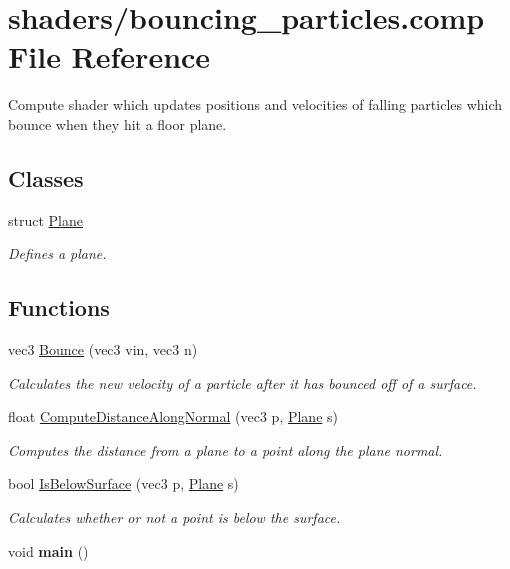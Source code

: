\hypertarget{bouncing__particles_8comp}{}\section{shaders/bouncing\+\_\+particles.comp File Reference}
\label{bouncing__particles_8comp}


Compute shader which updates positions and velocities of falling particles which bounce when they hit a floor plane.  


\subsection*{Classes}
\begin{DoxyCompactItemize}
\item 
struct \hyperlink{struct_plane}{Plane}
\begin{DoxyCompactList}\small\item\em Defines a plane. \end{DoxyCompactList}\end{DoxyCompactItemize}
\subsection*{Functions}
\begin{DoxyCompactItemize}
\item 
vec3 \hyperlink{bouncing__particles_8comp_a11c062c4611d15da5fb25a630e7298b9}{Bounce} (vec3 vin, vec3 n)
\begin{DoxyCompactList}\small\item\em Calculates the new velocity of a particle after it has bounced off of a surface. \end{DoxyCompactList}\item 
float \hyperlink{bouncing__particles_8comp_a5393b9632a296e4a790b4d9bbcf2fa34}{Compute\+Distance\+Along\+Normal} (vec3 p, \hyperlink{struct_plane}{Plane} s)
\begin{DoxyCompactList}\small\item\em Computes the distance from a plane to a point along the plane normal. \end{DoxyCompactList}\item 
bool \hyperlink{bouncing__particles_8comp_af355fbdc8876dcfd4808b4b97a33753a}{Is\+Below\+Surface} (vec3 p, \hyperlink{struct_plane}{Plane} s)
\begin{DoxyCompactList}\small\item\em Calculates whether or not a point is below the surface. \end{DoxyCompactList}\item 
\mbox{\label{bouncing__particles_8comp_acdef7a1fd863a6d3770c1268cb06add3}} 
void {\bfseries main} ()
\end{DoxyCompactItemize}
